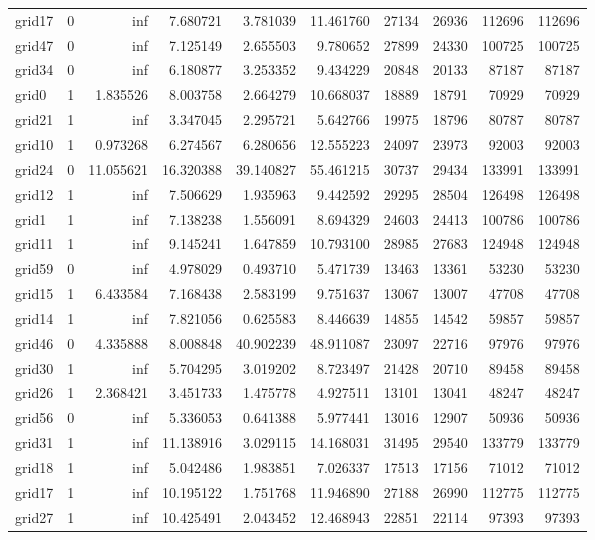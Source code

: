 \begin{longtable}{|l|r|r|r|r|r|r|r|r|r|}
grid17 & 0 & inf & 7.680721 & 3.781039 & 11.461760 & 27134 & 26936 & 112696 & 112696 \\
grid47 & 0 & inf & 7.125149 & 2.655503 & 9.780652 & 27899 & 24330 & 100725 & 100725 \\
grid34 & 0 & inf & 6.180877 & 3.253352 & 9.434229 & 20848 & 20133 & 87187 & 87187 \\
grid0 & 1 & 1.835526 & 8.003758 & 2.664279 & 10.668037 & 18889 & 18791 & 70929 & 70929 \\
grid21 & 1 & inf & 3.347045 & 2.295721 & 5.642766 & 19975 & 18796 & 80787 & 80787 \\
grid10 & 1 & 0.973268 & 6.274567 & 6.280656 & 12.555223 & 24097 & 23973 & 92003 & 92003 \\
grid24 & 0 & 11.055621 & 16.320388 & 39.140827 & 55.461215 & 30737 & 29434 & 133991 & 133991 \\
grid12 & 1 & inf & 7.506629 & 1.935963 & 9.442592 & 29295 & 28504 & 126498 & 126498 \\
grid1 & 1 & inf & 7.138238 & 1.556091 & 8.694329 & 24603 & 24413 & 100786 & 100786 \\
grid11 & 1 & inf & 9.145241 & 1.647859 & 10.793100 & 28985 & 27683 & 124948 & 124948 \\
grid59 & 0 & inf & 4.978029 & 0.493710 & 5.471739 & 13463 & 13361 & 53230 & 53230 \\
grid15 & 1 & 6.433584 & 7.168438 & 2.583199 & 9.751637 & 13067 & 13007 & 47708 & 47708 \\
grid14 & 1 & inf & 7.821056 & 0.625583 & 8.446639 & 14855 & 14542 & 59857 & 59857 \\
grid46 & 0 & 4.335888 & 8.008848 & 40.902239 & 48.911087 & 23097 & 22716 & 97976 & 97976 \\
grid30 & 1 & inf & 5.704295 & 3.019202 & 8.723497 & 21428 & 20710 & 89458 & 89458 \\
grid26 & 1 & 2.368421 & 3.451733 & 1.475778 & 4.927511 & 13101 & 13041 & 48247 & 48247 \\
grid56 & 0 & inf & 5.336053 & 0.641388 & 5.977441 & 13016 & 12907 & 50936 & 50936 \\
grid31 & 1 & inf & 11.138916 & 3.029115 & 14.168031 & 31495 & 29540 & 133779 & 133779 \\
grid18 & 1 & inf & 5.042486 & 1.983851 & 7.026337 & 17513 & 17156 & 71012 & 71012 \\
grid17 & 1 & inf & 10.195122 & 1.751768 & 11.946890 & 27188 & 26990 & 112775 & 112775 \\
grid27 & 1 & inf & 10.425491 & 2.043452 & 12.468943 & 22851 & 22114 & 97393 & 97393 \\

\end{longtable}
